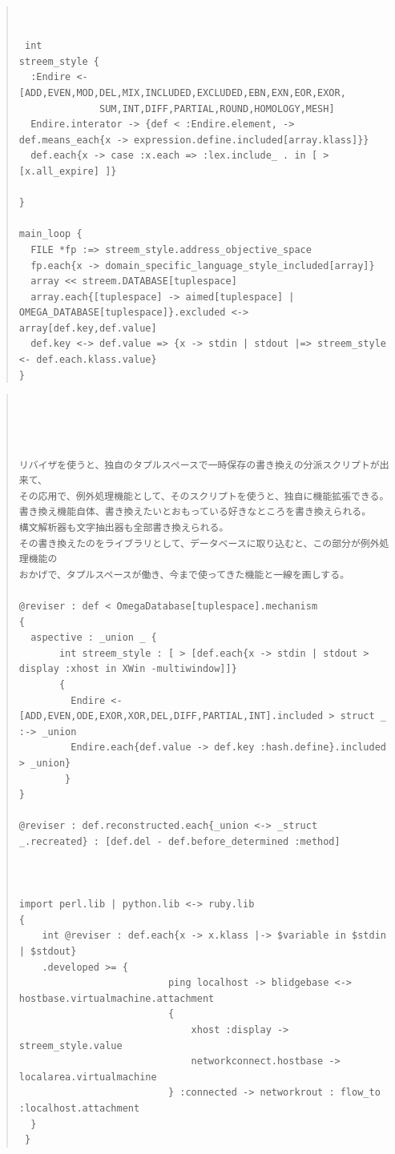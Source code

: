 \documentclass{jsarticle}
\begin{document}
\begin{quote}
\setlength{\baselineskip}{12pt}
\begin{verbatim}


 int 
streem_style {
  :Endire <- [ADD,EVEN,MOD,DEL,MIX,INCLUDED,EXCLUDED,EBN,EXN,EOR,EXOR,
              SUM,INT,DIFF,PARTIAL,ROUND,HOMOLOGY,MESH]
  Endire.interator -> {def < :Endire.element, -> def.means_each{x -> expression.define.included[array.klass]}}
  def.each{x -> case :x.each => :lex.include_ . in [ > [x.all_expire] ]}
  
}

main_loop {
  FILE *fp :=> streem_style.address_objective_space
  fp.each{x -> domain_specific_language_style_included[array]}
  array << streem.DATABASE[tuplespace]
  array.each{[tuplespace] -> aimed[tuplespace] | OMEGA_DATABASE[tuplespace]}.excluded <-> array[def.key,def.value]
  def.key <-> def.value => {x -> stdin | stdout |=> streem_style <- def.each.klass.value}
}

\end{verbatim}
\end{quote}

 
\begin{quote}
\setlength{\baselineskip}{12pt}
\begin{verbatim}

 
                      

リバイザを使うと、独自のタプルスペースで一時保存の書き換えの分派スクリプトが出来て、
その応用で、例外処理機能として、そのスクリプトを使うと、独自に機能拡張できる。
書き換え機能自体、書き換えたいとおもっている好きなところを書き換えられる。
構文解析器も文字抽出器も全部書き換えられる。
その書き換えたのをライブラリとして、データベースに取り込むと、この部分が例外処理機能の
おかげで、タプルスペースが働き、今まで使ってきた機能と一線を画しする。　

@reviser : def < OmegaDatabase[tuplespace].mechanism
{
  aspective : _union _ {
       int streem_style : [ > [def.each{x -> stdin | stdout > display :xhost in XWin -multiwindow]]}
       {
         Endire <- [ADD,EVEN,ODE,EXOR,XOR,DEL,DIFF,PARTIAL,INT].included > struct _ :-> _union
         Endire.each{def.value -> def.key :hash.define}.included > _union}
        }
}

@reviser : def.reconstructed.each{_union <-> _struct _.recreated} : [def.del - def.before_determined :method]



import perl.lib | python.lib <-> ruby.lib
{
	int @reviser : def.each{x -> x.klass |-> $variable in $stdin | $stdout}
	.developed >= {
                          ping localhost -> blidgebase <-> hostbase.virtualmachine.attachment
                          {
                              xhost :display -> streem_style.value
                              networkconnect.hostbase -> localarea.virtualmachine 
                          } :connected -> networkrout : flow_to :localhost.attachment
  }
 } 

\end{verbatim}
\end{quote}
\end{document}
